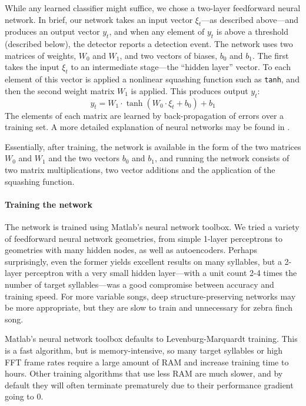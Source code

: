 \documentclass[10pt,letterpaper]{article}
\let\oldmarginpar\marginpar
\renewcommand{\marginpar}[1]{\oldmarginpar{\linespread{1}\scriptsize{#1}}}
\renewcommand{\subsubsection}[1]{\paragraph{#1}}
\begin{document}
While any learned classifier might suffice, we chose a two-layer feedforward neural network.  In brief, our network takes an input vector $\xi_t$---as described above---and produces an output vector $y_t$, and when any element of $y_t$ is above a threshold (described below), the detector reports a detection event.  The network uses two matrices of weights, $W_0$ and $W_1$, and two vectors of biases, $b_0$ and $b_1$.  The first takes the input $\xi_t$ to an intermediate stage---the ``hidden layer'' vector.  To each element of this vector is applied a nonlinear squashing function such as {\tt tanh}, and then the second weight matrix $W_1$ is applied.  This produces output $y_t$:
\begin{equation*}
  y_t = W_1 \cdot \tanh (W_0 \cdot \xi_t + b_0) + b_1
\end{equation*}
The elements of each matrix are learned by back-propagation of errors over a training set.  A more detailed explanation of neural networks may be found in \cite{hkp}.

Essentially, after training, the network is available in the form of the two matrices $W_0$ and $W_1$ and the two vectors $b_0$ and $b_1$, and running the network consists of two matrix multiplications, two vector additions and the application of the squashing function.\marginpar{I've left some other details.  Ok?}

\subsubsection{Training the network}

The network is trained using Matlab's neural network toolbox. We tried
a variety of feedforward neural network geometries, from simple
1-layer perceptrons to geometries with many hidden
nodes, as well as autoencoders. Perhaps surprisingly, even the former yields excellent results
on many syllables, but a 2-layer perceptron with a very small hidden
layer---with a unit count 2-4 times the number of target
syllables---was a good compromise between accuracy and training
speed. For more variable
songs, deep structure-preserving networks may be more appropriate, but
they are slow to train and unnecessary for zebra finch song.

Matlab's neural network toolbox defaults to Levenburg-Marquardt
training. This is a fast algorithm, but is memory-intensive, so
many target syllables or high FFT frame rates require a large
amount of RAM and increase training time to hours. Other training
algorithms that use less RAM are much slower, and by default they will
often terminate prematurely due to their performance gradient
going to 0.
\end{document}
